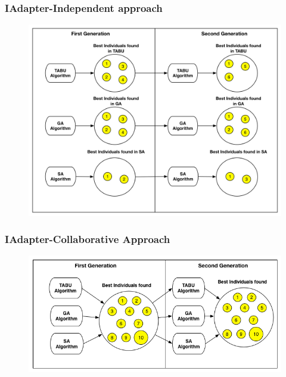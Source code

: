 \documentclass{beamer}
\begin{document}
\begin{frame}
\frametitle{IAdapter-Independent approach}
\begin{figure}[H]
\centering
\includegraphics[width=1\linewidth]{independ.png}
\end{figure}
\end{frame}



\begin{frame}
\frametitle{IAdapter-Collaborative Approach}
\begin{figure}[H]
\centering
\includegraphics[width=1\linewidth]{collaborative.png}
\end{figure}
\end{frame}
\end{document}

